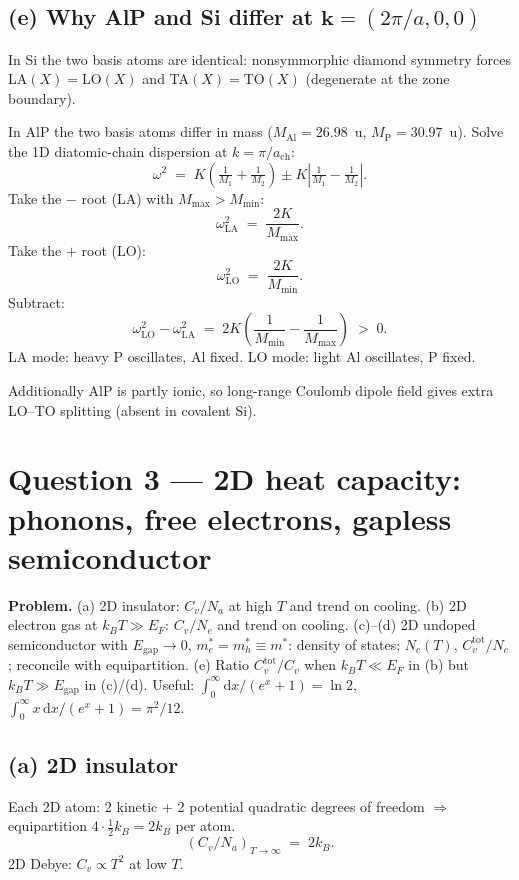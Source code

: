 \documentclass[11pt]{article}
\newcommand{\de}{\mathrm{d}}
\newcommand{\kB}{k_{B}}
\begin{document}
\subsection*{(e) Why AlP and Si differ at $\bm k=(2\pi/a,0,0)$}

In Si the two basis atoms are identical: nonsymmorphic diamond symmetry forces LA$(X)=$LO$(X)$ and TA$(X)=$TO$(X)$ (degenerate at the zone boundary).

In AlP the two basis atoms differ in mass ($M_{\text{Al}}=26.98$~u, $M_{\text{P}}=30.97$~u). Solve the 1D diatomic-chain dispersion at $k=\pi/a_{\text{ch}}$:
\[
\omega^2 \;=\; K\!\left(\tfrac{1}{M_1}+\tfrac{1}{M_2}\right) \pm K\!\left|\tfrac{1}{M_1}-\tfrac{1}{M_2}\right|.
\]
Take the $-$ root (LA) with $M_{\max}>M_{\min}$:
\[
\omega_{\text{LA}}^2 \;=\; \frac{2K}{M_{\max}}.
\]
Take the $+$ root (LO):
\[
\omega_{\text{LO}}^2 \;=\; \frac{2K}{M_{\min}}.
\]
Subtract:
\[
\omega_{\text{LO}}^2-\omega_{\text{LA}}^2 \;=\; 2K\!\left(\frac{1}{M_{\min}}-\frac{1}{M_{\max}}\right) \;>\; 0.
\]
LA mode: heavy P oscillates, Al fixed. LO mode: light Al oscillates, P fixed.

Additionally AlP is partly ionic, so long-range Coulomb dipole field gives extra LO--TO splitting (absent in covalent Si).

\section*{Question 3 --- 2D heat capacity: phonons, free electrons, gapless semiconductor}

\textbf{Problem.} (a) 2D insulator: $C_v/N_a$ at high $T$ and trend on cooling. (b) 2D electron gas at $\kB T\gg E_F$: $C_v/N_e$ and trend on cooling. (c)--(d) 2D undoped semiconductor with $E_{\text{gap}}\to 0$, $m_e^*=m_h^*\equiv m^*$: density of states; $N_c(T)$, $C_v^{\text{tot}}/N_c$; reconcile with equipartition. (e) Ratio $C_v^{\text{tot}}/C_v$ when $\kB T\ll E_F$ in (b) but $\kB T\gg E_{\text{gap}}$ in (c)/(d). Useful: $\int_0^\infty\de x/(e^x+1)=\ln 2$, $\int_0^\infty x\,\de x/(e^x+1)=\pi^2/12$.

\subsection*{(a) 2D insulator}

Each 2D atom: 2 kinetic + 2 potential quadratic degrees of freedom $\Rightarrow$ equipartition $4\cdot\tfrac12\kB=2\kB$ per atom.
\begin{equation}
\boxed{\;\left(C_v/N_a\right)_{T\to\infty} \;=\; 2\kB.\;}
\label{eq:DP2D}
\end{equation}
2D Debye: $C_v\propto T^2$ at low $T$. 
\end{document}
